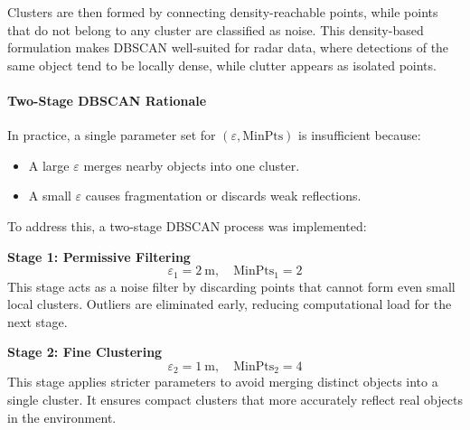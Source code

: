 \vspace{2\baselineskip}

Clusters are then formed by connecting density-reachable points, while points that do not belong to any cluster are classified as noise.  
This density-based formulation makes DBSCAN well-suited for radar data, where detections of the same object tend to be locally dense, while clutter appears as isolated points.

\paragraph{Two-Stage DBSCAN Rationale}
In practice, a single parameter set for $(\varepsilon, \text{MinPts})$ is insufficient because:
\begin{itemize}
    \item A large $\varepsilon$ merges nearby objects into one cluster.
    \item A small $\varepsilon$ causes fragmentation or discards weak reflections.
\end{itemize}

To address this, a two-stage DBSCAN process was implemented:

\textbf{Stage 1: Permissive Filtering}
\begin{equation}
    \varepsilon_1 = \SI{2}{\meter}, \quad \text{MinPts}_1 = 2
\end{equation}
This stage acts as a noise filter by discarding points that cannot form even small local clusters.  
Outliers are eliminated early, reducing computational load for the next stage.

\textbf{Stage 2: Fine Clustering}
\begin{equation}
    \varepsilon_2 = \SI{1}{\meter}, \quad \text{MinPts}_2 = 4
\end{equation}
This stage applies stricter parameters to avoid merging distinct objects into a single cluster.  
It ensures compact clusters that more accurately reflect real objects in the environment.

